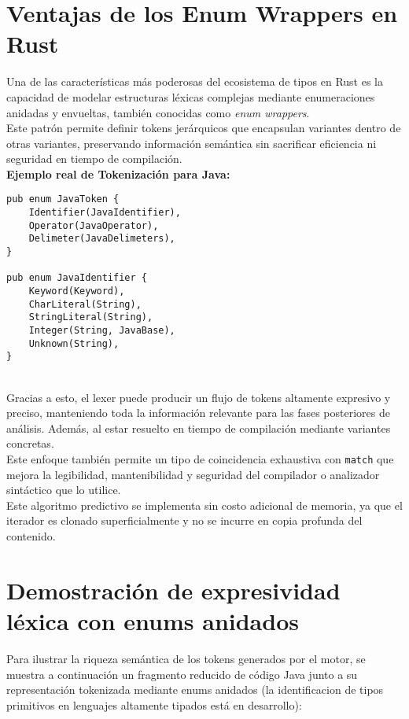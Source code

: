 \documentclass{article}
\begin{document}
\section*{Ventajas de los Enum Wrappers en Rust}

Una de las características más poderosas del ecosistema de tipos en Rust es la capacidad de modelar estructuras léxicas complejas mediante enumeraciones anidadas y envueltas, también conocidas como \textit{enum wrappers}.
\\
Este patrón permite definir tokens jerárquicos que encapsulan variantes dentro de otras variantes, preservando información semántica sin sacrificar eficiencia ni seguridad en tiempo de compilación.
\\

\textbf{Ejemplo real de Tokenización para Java:}

\begin{verbatim}
pub enum JavaToken {
    Identifier(JavaIdentifier),
    Operator(JavaOperator),
    Delimeter(JavaDelimeters),
}

pub enum JavaIdentifier {
    Keyword(Keyword),
    CharLiteral(String),
    StringLiteral(String),
    Integer(String, JavaBase),
    Unknown(String),
}
\end{verbatim}
\\
Gracias a esto, el lexer puede producir un flujo de tokens altamente expresivo y preciso, manteniendo toda la información relevante para las fases posteriores de análisis. Además, al estar resuelto en tiempo de compilación mediante variantes concretas.
\\
Este enfoque también permite un tipo de coincidencia exhaustiva con \texttt{match} que mejora la legibilidad, mantenibilidad y seguridad del compilador o analizador sintáctico que lo utilice.
\\
Este algoritmo predictivo se implementa sin costo adicional de memoria, ya que el iterador es clonado superficialmente y no se incurre en copia profunda del contenido.

\section*{Demostración de expresividad léxica con enums anidados}

Para ilustrar la riqueza semántica de los tokens generados por el motor, se muestra a continuación un fragmento reducido de código Java junto a su representación tokenizada mediante enums anidados (la identificacion de tipos primitivos en lenguajes altamente tipados está en desarrollo):
\end{document}
